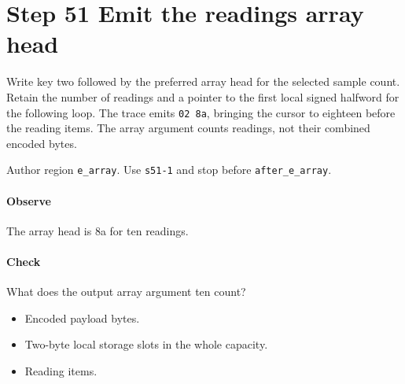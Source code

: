 \section{Step 51 Emit the readings array head}\label{cbor-s51}
Write key two followed by the preferred array head for the selected sample count. Retain the number of readings and a pointer to the first local signed halfword for the following loop. The trace emits \texttt{02 8a}, bringing the cursor to eighteen before the reading items. The array argument counts readings, not their combined encoded bytes.

Author region \texttt{e\_array}. Use \texttt{s51-1} and stop before \texttt{after\_e\_array}.

\paragraph{Observe} The array head is 8a for ten readings.

\paragraph{Check} What does the output array argument ten count?
\begin{itemize}
  \item[A.] Encoded payload bytes.
  \item[B.] Two-byte local storage slots in the whole capacity.
  \item[C.] Reading items.
\end{itemize}
